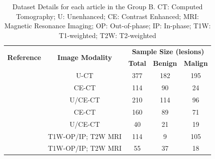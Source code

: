 \documentclass{article}
\begin{document}
\begin{table}[]
    \centering
    \begin{tabular}{ccccc}\toprule
        \multirow{2}{*}{\textbf{Reference}} & \multirow{2}{*}{\textbf{Image Modality}} & \multicolumn{3}{c}{\textbf{Sample Size (lesions)}}
        \\\cmidrule(lr){3-5}
                                            &                                          & \textbf{Total}                                     & \textbf{Benign} & \textbf{Malign} \\\midrule
        \cite{Shoemaker2018}                & U-CT                                     & 377                                                & 182             & 195             \\
        \cite{Koyuncu2019}                  & CE-CT                                    & 114                                                & 90              & 24              \\
        \cite{Li2019}                       & U/CE-CT                                  & 210                                                & 114             & 96              \\
        \cite{Andersen2021}                 & CE-CT                                    & 160                                                & 89              & 71              \\
        \cite{Moawad2021}                   & U/CE-CT                                  & 40                                                 & 21              & 19              \\
        \cite{Barstugan2020}                & T1W-OP/IP; T2W MRI                       & 114                                                & 9               & 105             \\
        \cite{Stanzione2021}                & T1W-OP/IP; T2W MRI                       & 55                                                 & 37              & 18              \\
        \bottomrule
    \end{tabular}
    \caption{Dataset Details for each article in the Group B. CT: Computed Tomography; U: Unenhanced; CE: Contrast Enhanced; MRI: Magnetic Resonance Imaging; OP: Out-of-phase; IP: In-phase; T1W: T1-weighted; T2W: T2-weighted}
    \label{tab:data_B}
\end{table}
\end{document}
